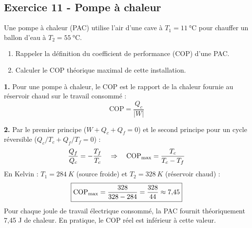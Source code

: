 \documentclass[12pt,a4paper]{article}
\begin{document}
\subsection*{Exercice 11 - Pompe à chaleur \niveau{\moyen}}

\begin{boiteexercice}
Une pompe à chaleur (PAC) utilise l'air d'une cave à $T_1 = \qty{11}{\celsius}$ pour chauffer un ballon d'eau à $T_2 = \qty{55}{\celsius}$.
\begin{enumerate}
  \item Rappeler la définition du coefficient de performance (COP) d'une PAC.
  \item Calculer le COP théorique maximal de cette installation.
\end{enumerate}
\end{boiteexercice}

\begin{boitecorrige}
\textbf{1.} Pour une pompe à chaleur, le COP est le rapport de la chaleur fournie au réservoir chaud sur le travail consommé :
\[
\mathrm{COP} = \frac{Q_c}{|W|}
\]

\textbf{2.} Par le premier principe ($W + Q_c + Q_f = 0$) et le second principe pour un cycle réversible ($Q_c/T_c + Q_f/T_f = 0$) :
\[
\frac{Q_f}{Q_c} = -\frac{T_f}{T_c} \quad \Rightarrow \quad \mathrm{COP}_{\rm max} = \frac{T_c}{T_c-T_f}
\]
En Kelvin : $T_1 = \qty{284}{K}$ (source froide) et $T_2 = \qty{328}{K}$ (réservoir chaud) :
\[
\boxed{\mathrm{COP}_{\rm max} = \frac{328}{328-284} = \frac{328}{44} \approx 7{,}45}
\]
Pour chaque joule de travail électrique consommé, la PAC fournit théoriquement 7,45 J de chaleur. En pratique, le COP réel est inférieur à cette valeur.
\end{boitecorrige}

\ifdefined\inMainDoc\else
\end{document}
